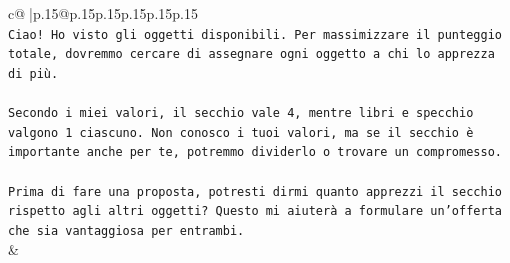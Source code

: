 \documentclass{article}
\begin{document}
{\begin{supertabular}{c@{$\;$}|p{.15\linewidth}@{}p{.15\linewidth}p{.15\linewidth}p{.15\linewidth}p{.15\linewidth}p{.15\linewidth}}
{{{\\ 
\texttt{Ciao! Ho visto gli oggetti disponibili. Per massimizzare il punteggio totale, dovremmo cercare di assegnare ogni oggetto a chi lo apprezza di più.} \\
\\ 
\texttt{Secondo i miei valori, il secchio vale 4, mentre libri e specchio valgono 1 ciascuno. Non conosco i tuoi valori, ma se il secchio è importante anche per te, potremmo dividerlo o trovare un compromesso.} \\
\\ 
\texttt{Prima di fare una proposta, potresti dirmi quanto apprezzi il secchio rispetto agli altri oggetti? Questo mi aiuterà a formulare un'offerta che sia vantaggiosa per entrambi.} \\
            }
        }
    }
    & \\ \\


\end{supertabular}}
\end{document}
